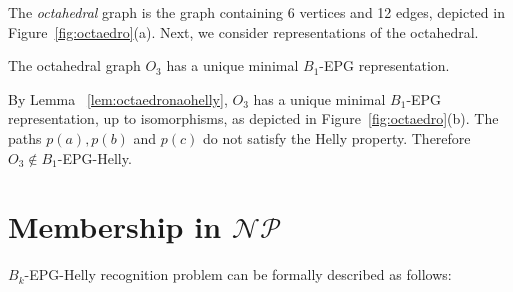 \documentclass[runningheads]{llncs}
\begin{document}
The \textit{octahedral} graph is the graph containing 6 vertices and 12 edges, depicted  in Figure~\ref{fig:octaedro}(a). Next, we consider representations of the octahedral.

\begin{lemma}\label{lem:octaedronaohelly}
The octahedral graph $O_3$ has a unique minimal  $ B_1$-EPG representation.%
\end{lemma}


 \vspace{-.5cm}

By Lemma ~\ref{lem:octaedronaohelly},  $ O_3 $ has a unique minimal $B_1$-EPG representation, up to isomorphisms, as depicted in Figure~\ref{fig:octaedro}(b). The paths $ p(a), p(b) $ and $ p(c) $  do not satisfy the Helly property. Therefore $O_3 \notin B_1$-EPG-Helly. 

\section{Membership in $\mathcal{NP}$} 

{\sc $B_k$-EPG-Helly recognition} problem can be formally described as follows:


\end{document}
